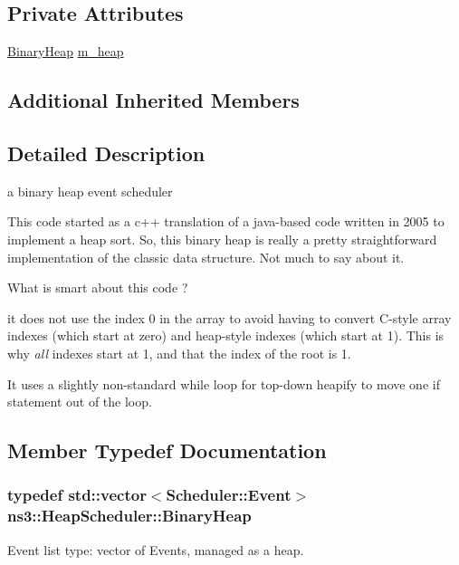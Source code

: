 \subsection*{Private Attributes}
\begin{DoxyCompactItemize}
\item 
\hyperlink{classns3_1_1HeapScheduler_a54aa30c97bec500ae47a0e8280cf6457}{Binary\+Heap} \hyperlink{classns3_1_1HeapScheduler_a2c9f37bd4c53d3bd08147bfd8734f7da}{m\+\_\+heap}
\end{DoxyCompactItemize}
\subsection*{Additional Inherited Members}


\subsection{Detailed Description}
a binary heap event scheduler 

This code started as a c++ translation of a java-\/based code written in 2005 to implement a heap sort. So, this binary heap is really a pretty straightforward implementation of the classic data structure. Not much to say about it.

What is smart about this code ?
\begin{DoxyItemize}
\item it does not use the index 0 in the array to avoid having to convert C-\/style array indexes (which start at zero) and heap-\/style indexes (which start at 1). This is why {\itshape all} indexes start at 1, and that the index of the root is 1.
\item It uses a slightly non-\/standard while loop for top-\/down heapify to move one if statement out of the loop. 
\end{DoxyItemize}

\subsection{Member Typedef Documentation}
\subsubsection[{\texorpdfstring{Binary\+Heap}{BinaryHeap}}]{\setlength{\rightskip}{0pt plus 5cm}typedef std\+::vector$<${\bf Scheduler\+::\+Event}$>$ {\bf ns3\+::\+Heap\+Scheduler\+::\+Binary\+Heap}\hspace{0.3cm}{\ttfamily [private]}}\hypertarget{classns3_1_1HeapScheduler_a54aa30c97bec500ae47a0e8280cf6457}{}\label{classns3_1_1HeapScheduler_a54aa30c97bec500ae47a0e8280cf6457}
Event list type\+: vector of Events, managed as a heap. 

